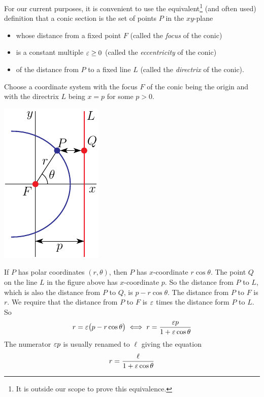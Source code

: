 \begin{eg}
{\begin{efig}
\begin{center}
\end{center}
\end{efig}
}
For our current purposes, it is convenient to use the 
equivalent\footnote{It is outside our scope to prove this equivalence.} 
(and often used) definition that a conic section is the set of points $P$ 
in the $xy$-plane 
\begin{itemize}\itemsep1pt \parskip0pt  %
\item
whose distance from a fixed point $F$ (called the \emph{focus} of the conic) 
\item
is a constant multiple $\varepsilon\ge 0$ (called the \emph{eccentricity} 
of the conic)
\item  
of the distance from $P$ to a fixed line $L$ (called the \emph{directrix} 
of the conic).
\end{itemize}
Choose a coordinate system with the focus $F$ of the conic being the origin
and with the directrix $L$ being $x=p$ for some $p>0$. 
\begin{efig}
\begin{center}
    \includegraphics{conic.pdf}
\end{center}
\end{efig}
If $P$ has polar coordinates $(r,\theta)$, then $P$ has $x$-coordinate
$r\cos\theta$. The point $Q$ on the line $L$ in the figure above 
has $x$-coordinate $p$.
So the distance from $P$ to $L$, which is also the distance from $P$ to
$Q$, is $p-r\cos\theta$.  The distance from $P$ to $F$ is $r$. We require that 
the distance from $P$ to $F$ is $\varepsilon$ times the distance form $P$ to $L$.
So
\begin{equation*}
r=\varepsilon\big(p-r\cos\theta\big)
\iff 
r=\frac{\varepsilon p}{1+\varepsilon\cos\theta}
\end{equation*}
The numerator $\varepsilon p$ is usually renamed to $\ell$ giving the equation
\begin{equation*}
r=\frac{\ell}{1+\varepsilon\cos\theta}
\end{equation*}
\end{eg}


